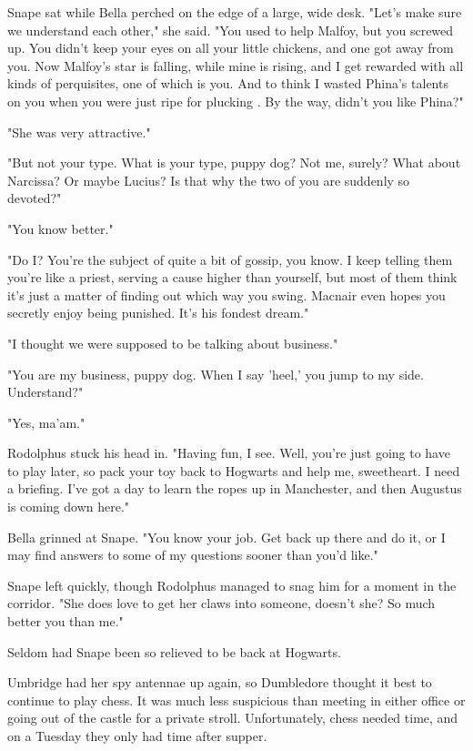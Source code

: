 \documentclass[a4paper,11pt]{article}
\begin{document}
Snape sat while Bella perched on the edge of a large, wide desk. "Let's make sure we understand each other," she said. "You used to help Malfoy, but you screwed up. You didn't keep your eyes on all your little chickens, and one got away from you. Now Malfoy's star is falling, while mine is rising, and I get rewarded with all kinds of perquisites, one of which is you. And to think I wasted Phina's talents on you when you were just ripe for plucking . By the way, didn't you like Phina?"

"She was very attractive."

"But not your type. What is your type, puppy dog? Not me, surely? What about Narcissa? Or maybe Lucius? Is that why the two of you are suddenly so devoted?"

"You know better."

"Do I? You're the subject of quite a bit of gossip, you know. I keep telling them you're like a priest, serving a cause higher than yourself, but most of them think it's just a matter of finding out which way you swing. Macnair even hopes you secretly enjoy being punished. It's his fondest dream."

"I thought we were supposed to be talking about business."

"You are my business, puppy dog. When I say 'heel,' you jump to my side. Understand?"

"Yes, ma'am."

Rodolphus stuck his head in. "Having fun, I see. Well, you're just going to have to play later, so pack your toy back to Hogwarts and help me, sweetheart. I need a briefing. I've got a day to learn the ropes up in Manchester, and then Augustus is coming down here."

Bella grinned at Snape. "You know your job. Get back up there and do it, or I may find answers to some of my questions sooner than you'd like."

Snape left quickly, though Rodolphus managed to snag him for a moment in the corridor. "She does love to get her claws into someone, doesn't she? So much better you than me."

Seldom had Snape been so relieved to be back at Hogwarts.

Umbridge had her spy antennae up again, so Dumbledore thought it best to continue to play chess. It was much less suspicious than meeting in either office or going out of the castle for a private stroll. Unfortunately, chess needed time, and on a Tuesday they only had time after supper.
\end{document}
